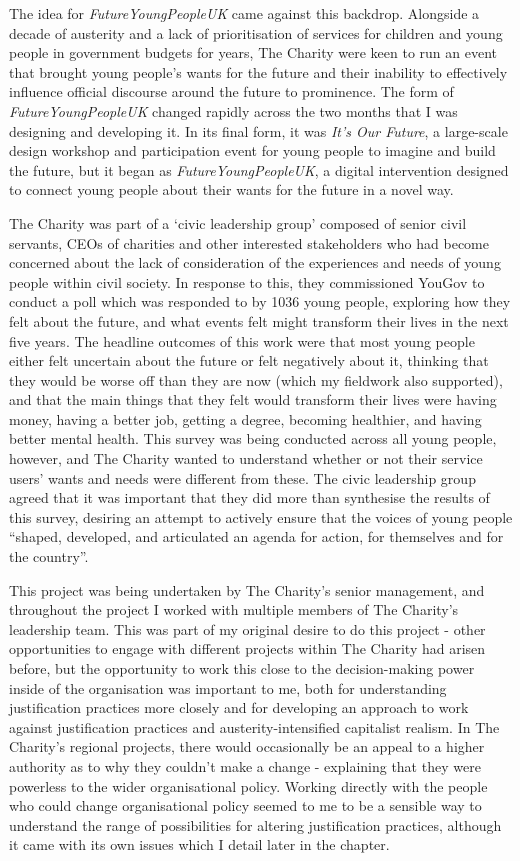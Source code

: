 The idea for \textit{FutureYoungPeopleUK} came against this backdrop. Alongside a decade of austerity and a lack of prioritisation of services for children and young people in government budgets for years, The Charity were keen to run an event that brought young people’s wants for the future and their inability to effectively influence official discourse around the future to prominence. The form of \emph{FutureYoungPeopleUK} changed rapidly across the two months that I was designing and developing it. In its final form, it was \emph{It’s Our Future}, a large-scale design workshop and participation event for young people to imagine and build the future, but it began as \emph{FutureYoungPeopleUK}, a digital intervention designed to connect young people about their wants for the future in a novel way. 

The Charity was part of a ‘civic leadership group’ composed of senior civil servants, CEOs of charities and other interested stakeholders who had become concerned about the lack of consideration of the experiences and needs of young people within civil society. In response to this, they commissioned YouGov to conduct a poll which was responded to by 1036 young people, exploring how they felt about the future, and what events felt might transform their lives in the next five years. The headline outcomes of this work were that most young people either felt uncertain about the future or felt negatively about it, thinking that they would be worse off than they are now (which my fieldwork also supported), and that the main things that they felt would transform their lives were having money, having a better job, getting a degree, becoming healthier, and having better mental health. This survey was being conducted across all young people,  however, and The Charity wanted to understand whether or not their service users' wants and needs were different from these. The civic leadership group agreed that it was important that they did more than synthesise the results of this survey, desiring an attempt to actively ensure that the voices of young people “shaped, developed, and articulated an agenda for action, for themselves and for the country”. 

This project was being undertaken by The Charity's senior management, and throughout the project I worked with multiple members of The Charity's leadership team. This was part of my original desire to do this project - other opportunities to engage with different projects within The Charity had arisen before, but the opportunity to work this close to the decision-making power inside of the organisation was important to me, both for understanding justification practices more closely and for developing an approach to work against justification practices and austerity-intensified capitalist realism. In The Charity's regional projects, there would occasionally be an appeal to a higher authority as to why they couldn't make a change - explaining that they were powerless to the wider organisational policy. Working directly with the people who could change organisational policy seemed to me to be a sensible way to understand the range of possibilities for altering justification practices, although it came with its own issues which I detail later in the chapter.

